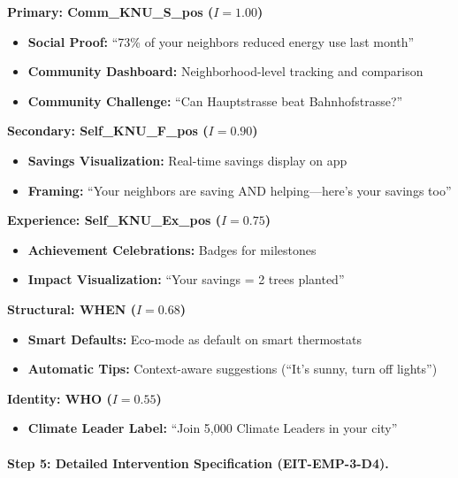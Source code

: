 \begin{tcolorbox}[colback=green!5!white, colframe=green!75!black,
    title=\textbf{Energy Conservation Intervention Package}]

\textbf{Primary: Comm\_KNU\_S\_pos ($I = 1.00$)}
\begin{itemize}[nosep]
    \item \textbf{Social Proof:} ``73\% of your neighbors reduced energy use last month''
    \item \textbf{Community Dashboard:} Neighborhood-level tracking and comparison
    \item \textbf{Community Challenge:} ``Can Hauptstrasse beat Bahnhofstrasse?''
\end{itemize}

\textbf{Secondary: Self\_KNU\_F\_pos ($I = 0.90$)}
\begin{itemize}[nosep]
    \item \textbf{Savings Visualization:} Real-time savings display on app
    \item \textbf{Framing:} ``Your neighbors are saving AND helping---here's your savings too''
\end{itemize}

\textbf{Experience: Self\_KNU\_Ex\_pos ($I = 0.75$)}
\begin{itemize}[nosep]
    \item \textbf{Achievement Celebrations:} Badges for milestones
    \item \textbf{Impact Visualization:} ``Your savings = 2 trees planted''
\end{itemize}

\textbf{Structural: WHEN ($I = 0.68$)}
\begin{itemize}[nosep]
    \item \textbf{Smart Defaults:} Eco-mode as default on smart thermostats
    \item \textbf{Automatic Tips:} Context-aware suggestions (``It's sunny, turn off lights'')
\end{itemize}

\textbf{Identity: WHO ($I = 0.55$)}
\begin{itemize}[nosep]
    \item \textbf{Climate Leader Label:} ``Join 5,000 Climate Leaders in your city''
\end{itemize}

\end{tcolorbox}

\paragraph{Step 5: Detailed Intervention Specification (EIT-EMP-3-D4).}

